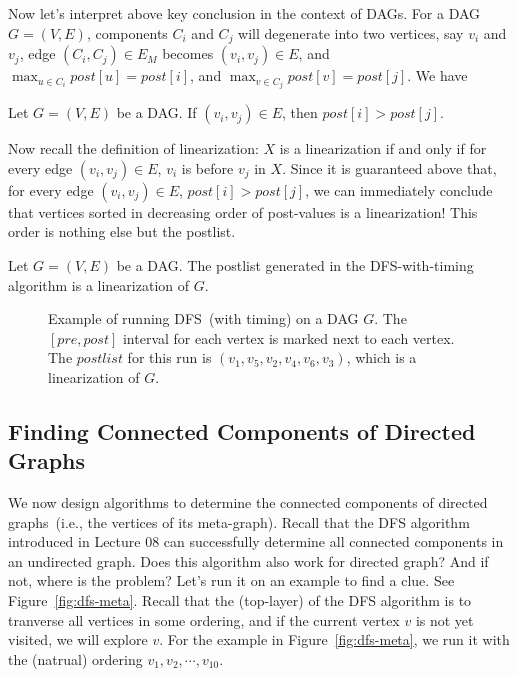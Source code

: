 Now let's interpret above key conclusion in the context of DAGs.
For a DAG $G = (V, E)$, components $C_i$ and $C_j$ will degenerate into two vertices, say $v_i$ and $v_j$,
edge $(C_i, C_j)\in E_M$ becomes $(v_i, v_j)\in E$, and $\max_{u\in C_i} post[u] = post[i]$, and 
$\max_{v\in C_j} post[v] = post[j]$. We have

\begin{corollary}
Let $G = (V, E)$ be a DAG. If $(v_i, v_j)\in E$, then $post[i] > post[j]$.
\end{corollary}

Now recall the definition of linearization: $X$ is a linearization if and only if
for every edge $(v_i, v_j)\in E$, $v_i$ is before $v_j$ in $X$.
Since it is guaranteed above that, 
for every edge $(v_i, v_j)\in E$, $post[i] > post[j]$,
we can immediately conclude that vertices sorted in decreasing order of post-values
is a linearization! This order is nothing else but the postlist.

\begin{corollary}
Let $G = (V, E)$ be a DAG. The postlist generated in the DFS-with-timing algorithm is a linearization of $G$.
\end{corollary}



\begin{figure}[h!]
\centering{}
\caption{Example of running DFS~(with timing) on a DAG $G$. The $[pre,post]$ interval for each vertex
is marked next to each vertex. The $postlist$ for this run is $(v_1, v_5, v_2, v_4, v_6, v_3)$, which is a linearization of $G$.}
\label{fig:meta-graph}
\end{figure}

\subsection*{Finding Connected Components of Directed Graphs}

We now design algorithms to determine the connected components of directed graphs~(i.e., the vertices of its meta-graph).
Recall that the DFS algorithm introduced in Lecture 08 can successfully determine all connected components in an undirected graph.
Does this algorithm also work for directed graph? And if not, where is the problem? 
Let's run it on an example to find a clue. See Figure~\ref{fig:dfs-meta}.
Recall that the (top-layer) of the DFS algorithm is to tranverse all vertices in some ordering,
and if the current vertex $v$ is not yet visited, we will explore $v$.
For the example in Figure~\ref{fig:dfs-meta}, we run it with the (natrual) ordering $v_1, v_2, \cdots, v_{10}$.


